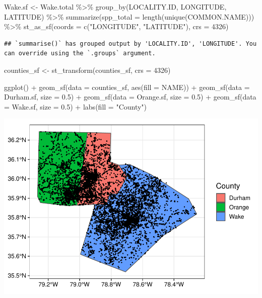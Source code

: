 \documentclass[
  12pt,
]{article}
\newenvironment{Shaded}{\begin{snugshade}}{\end{snugshade}}
\newcommand{\AttributeTok}[1]{\textcolor[rgb]{0.77,0.63,0.00}{#1}}
\newcommand{\DecValTok}[1]{\textcolor[rgb]{0.00,0.00,0.81}{#1}}
\newcommand{\FloatTok}[1]{\textcolor[rgb]{0.00,0.00,0.81}{#1}}
\newcommand{\FunctionTok}[1]{\textcolor[rgb]{0.00,0.00,0.00}{#1}}
\newcommand{\NormalTok}[1]{#1}
\newcommand{\OtherTok}[1]{\textcolor[rgb]{0.56,0.35,0.01}{#1}}
\newcommand{\SpecialCharTok}[1]{\textcolor[rgb]{0.00,0.00,0.00}{#1}}
\newcommand{\StringTok}[1]{\textcolor[rgb]{0.31,0.60,0.02}{#1}}
\begin{document}
\begin{Shaded}
\begin{Highlighting}[]
\NormalTok{Wake.sf }\OtherTok{\textless{}{-}}\NormalTok{ Wake.total }\SpecialCharTok{\%\textgreater{}\%}
  \FunctionTok{group\_by}\NormalTok{(LOCALITY.ID, LONGITUDE, LATITUDE) }\SpecialCharTok{\%\textgreater{}\%}
  \FunctionTok{summarize}\NormalTok{(}\AttributeTok{spp\_total =} \FunctionTok{length}\NormalTok{(}\FunctionTok{unique}\NormalTok{(COMMON.NAME))) }\SpecialCharTok{\%\textgreater{}\%}
  \FunctionTok{st\_as\_sf}\NormalTok{(}\AttributeTok{coords =} \FunctionTok{c}\NormalTok{(}\StringTok{"LONGITUDE"}\NormalTok{, }\StringTok{"LATITUDE"}\NormalTok{), }\AttributeTok{crs =} \DecValTok{4326}\NormalTok{)}
\end{Highlighting}
\end{Shaded}

\begin{verbatim}
## `summarise()` has grouped output by 'LOCALITY.ID', 'LONGITUDE'. You can override using the `.groups` argument.
\end{verbatim}

\begin{Shaded}
\begin{Highlighting}[]
\NormalTok{counties\_sf }\OtherTok{\textless{}{-}} \FunctionTok{st\_transform}\NormalTok{(counties\_sf, }\AttributeTok{crs =} \DecValTok{4326}\NormalTok{)}

\FunctionTok{ggplot}\NormalTok{() }\SpecialCharTok{+} \FunctionTok{geom\_sf}\NormalTok{(}\AttributeTok{data =}\NormalTok{ counties\_sf, }\FunctionTok{aes}\NormalTok{(}\AttributeTok{fill =}\NormalTok{ NAME)) }\SpecialCharTok{+} 
  \FunctionTok{geom\_sf}\NormalTok{(}\AttributeTok{data =}\NormalTok{ Durham.sf, }\AttributeTok{size =} \FloatTok{0.5}\NormalTok{) }\SpecialCharTok{+} 
  \FunctionTok{geom\_sf}\NormalTok{(}\AttributeTok{data =}\NormalTok{ Orange.sf, }\AttributeTok{size =} \FloatTok{0.5}\NormalTok{) }\SpecialCharTok{+} 
  \FunctionTok{geom\_sf}\NormalTok{(}\AttributeTok{data =}\NormalTok{ Wake.sf, }\AttributeTok{size =} \FloatTok{0.5}\NormalTok{) }\SpecialCharTok{+} \FunctionTok{labs}\NormalTok{(}\AttributeTok{fill =} \StringTok{"County"}\NormalTok{)}
\end{Highlighting}
\end{Shaded}

\includegraphics{Project_Template_files/figure-latex/Geospatial EDA-1.pdf}
\end{document}
